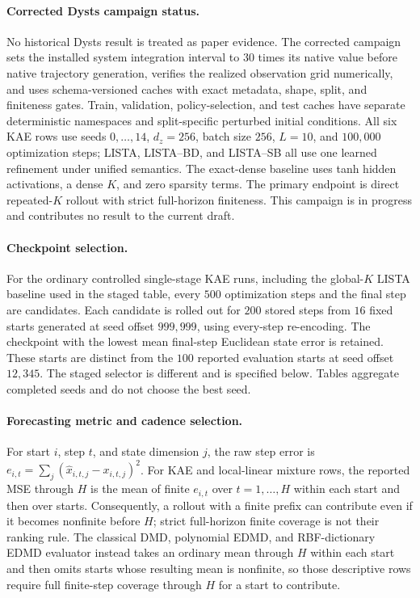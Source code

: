 \paragraph{Corrected Dysts campaign status.}
No historical Dysts result is treated as paper evidence. The corrected campaign sets the installed system integration interval to \(30\) times its native value before native trajectory generation, verifies the realized observation grid numerically, and uses schema-versioned caches with exact metadata, shape, split, and finiteness gates. Train, validation, policy-selection, and test caches have separate deterministic namespaces and split-specific perturbed initial conditions. All six KAE rows use seeds \(0,\ldots,14\), \(d_z=256\), batch size \(256\), \(L=10\), and \(100{,}000\) optimization steps; LISTA, LISTA--BD, and LISTA--SB all use one learned refinement under unified semantics. The exact-dense baseline uses tanh hidden activations, a dense \(K\), and zero sparsity terms. The primary endpoint is direct repeated-\(K\) rollout with strict full-horizon finiteness. This campaign is in progress and contributes no result to the current draft.

\paragraph{Checkpoint selection.}
For the ordinary controlled single-stage KAE runs, including the global-\(K\) LISTA baseline used in the staged table, every \(500\) optimization steps and the final step are candidates. Each candidate is rolled out for \(200\) stored steps from \(16\) fixed starts generated at seed offset \(999{,}999\), using every-step re-encoding. The checkpoint with the lowest mean final-step Euclidean state error is retained. These starts are distinct from the \(100\) reported evaluation starts at seed offset \(12{,}345\). The staged selector is different and is specified below. Tables aggregate completed seeds and do not choose the best seed.

\paragraph{Forecasting metric and cadence selection.}
For start \(i\), step \(t\), and state dimension \(j\), the raw step error is \(e_{i,t}=\sum_j(\hat x_{i,t,j}-x_{i,t,j})^2\). For KAE and local-linear mixture rows, the reported MSE through \(H\) is the mean of finite \(e_{i,t}\) over \(t=1,\ldots,H\) within each start and then over starts. Consequently, a rollout with a finite prefix can contribute even if it becomes nonfinite before \(H\); strict full-horizon finite coverage is not their ranking rule. The classical DMD, polynomial EDMD, and RBF-dictionary EDMD evaluator instead takes an ordinary mean through \(H\) within each start and then omits starts whose resulting mean is nonfinite, so those descriptive rows require full finite-step coverage through \(H\) for a start to contribute.

